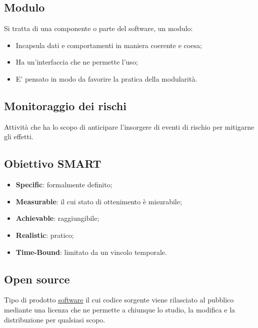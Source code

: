	
	\subsection{Modulo}
	\label{sec:modulo}
	Si tratta di una componente o parte del software, un modulo:
	\begin{itemize}
	\item Incapsula dati e comportamenti in maniera coerente e coesa;
	\item Ha un'interfaccia che ne permette l'uso;
	\item E' pensato in modo da favorire la pratica della modularità.
	\end{itemize}
	
	
	\subsection{Monitoraggio dei rischi}
	\label{sec:monitoraggiorischi}
	Attività che ha lo scopo di anticipare l'insorgere di eventi di rischio per mitigarne gli effetti.	
	

	\newpage

	\subsection{Obiettivo SMART}
	\label{sec:smart}
	\begin{itemize}
			\item \textbf{Specific}: formalmente definito;
			\item \textbf{Measurable}: il cui stato di ottenimento è misurabile;
			\item \textbf{Achievable}: raggiungibile;
			\item \textbf{Realistic}: pratico;
			\item \textbf{Time-Bound}: limitato da un vincolo temporale.
		\end{itemize}


		
	\subsection{Open source}
	\label{sec:opensource}
	Tipo di prodotto \underline{\hyperref[sec:prodottosoftware]{software}} il cui codice sorgente viene rilasciato al pubblico mediante una licenza che ne permette a chiunque lo studio, la modifica e la distribuzione per qualsiasi scopo.
		


